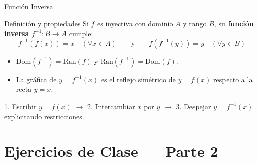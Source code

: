 \documentclass[aspectratio=169]{beamer}
\begin{document}
\begin{frame}{Función Inversa}
  \begin{block}{Definición y propiedades}
    Si $f$ es inyectiva con dominio $A$ y rango $B$, su \textbf{función inversa} $f^{-1}: B \to A$ cumple:
    $$f^{-1}(f(x)) = x \quad (\forall x \in A) \qquad\text{y}\qquad f(f^{-1}(y)) = y \quad (\forall y \in B)$$
    \begin{itemize}
      \item $\text{Dom}(f^{-1}) = \text{Ran}(f)$ \quad y \quad $\text{Ran}(f^{-1}) = \text{Dom}(f)$.
      \item La gráfica de $y = f^{-1}(x)$ es el reflejo simétrico de $y = f(x)$ respecto a la recta \textbf{$y = x$}.
    \end{itemize}
  \end{block}

  \vspace{4pt}
  \begin{mwpasos}
    1. Escribir $y = f(x)$ $\longrightarrow$ 2. Intercambiar $x$ por $y$ $\longrightarrow$ 3. Despejar $y = f^{-1}(x)$ explicitando restricciones.
  \end{mwpasos}
\end{frame}



\section{Ejercicios de Clase — Parte 2}
\end{document}
